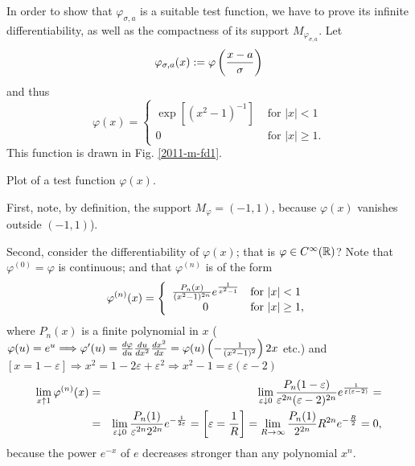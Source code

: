 {\color{OliveGreen}
\bproof
In order to show that $\varphi_{\sigma ,a}$ is a suitable test function,
we have to prove its infinite differentiability, as well as the compactness of its support
$M_{\varphi_{\sigma, a}}$.
Let
$$
   \varphi_{\sigma,a}(x):=\varphi\left({ x- a
   \over\sigma}\right)
$$
and thus
$$
   \varphi(x)=
\begin{cases}
\exp \left[\left( x^2-1\right)^{-1}\right] &\textrm{ for } |x|<1\\
                 0 &\textrm{ for }|x|\geq 1
.
\end{cases}
$$
This function is drawn in Fig. \ref{2011-m-fd1}.
{\color{black}
\begin{marginfigure}
\begin{center}
\end{center}
\caption{Plot of a test function $\varphi(x)$. }
\label{2011-m-fd1}
\end{marginfigure}
}


First, note, by definition, the support  $M_\varphi=(-1,1)$,
because $\varphi (x)$   vanishes outside  $(-1,1)$).

Second, consider the differentiability of $\varphi (x)$;
that is $\varphi\in C^\infty({\Bbb R})$?
Note that
$\varphi^{(0)}=\varphi$ is continuous;
and that $\varphi^{(n)}$ is of the form
$$
   \varphi^{(n)}(x)=\left\{\begin{array}{cl}
                         {P_n(x)\over(x^2-1)^{2n}}    e^{1\over x^2-1}&\mbox{for $|x|<1$}\\
                         0&\mbox{for $|x|\geq1$,}
                    \end{array}\right.
$$
where $P_n(x)$ is a finite polynomial in $x$
 ($\varphi(u)=e^u\Longrightarrow
\varphi'(u)={d\varphi\over du}{du\over dx^2}{dx^2\over dx}=\varphi(u)
\left(-{1\over(x^2-1)^2}\right)2x$ etc.) and $[x=1-\varepsilon]\Longrightarrow
x^2=1-2\varepsilon+\varepsilon^2\Longrightarrow x^2-1=
\varepsilon(\varepsilon-2)$
\begin{eqnarray*}
   \lim_{x\uparrow1}\varphi^{(n)}(x)&=&\lim_{\varepsilon\downarrow0}
      {P_n(1-\varepsilon)\over\varepsilon^{2n}(\varepsilon-2)^{2n}}
      e^{1\over\varepsilon(\varepsilon-2)}=\\
   &=&\lim_{\varepsilon\downarrow0}{P_n(1)\over\varepsilon^{2n}2^{2n}}
      e^{-{1\over2\varepsilon}}=\left[\varepsilon={1\over R}\right]=
      \lim_{R\to\infty}{P_n(1)\over2^{2n}}R^{2n}e^{-{R\over2}}=0,
\end{eqnarray*}
because the power $e^{-x}$ of $e$
decreases stronger
than any polynomial  $x^n$.

}
